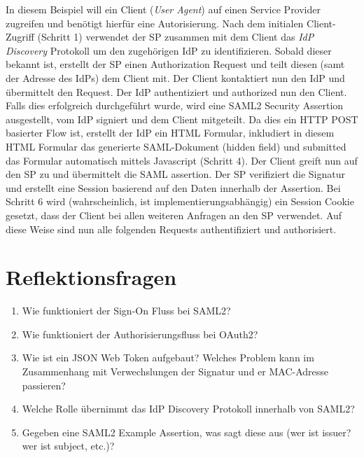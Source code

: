 In diesem Beispiel will ein Client (\textit{User Agent}) auf einen Service Provider zugreifen und benötigt hierfür eine Autorisierung. Nach dem initialen Client-Zugriff (Schritt 1) verwendet der SP zusammen mit dem Client das \textit{IdP Discovery} Protokoll um den zugehörigen IdP zu identifizieren. Sobald dieser bekannt ist, erstellt der SP einen Authorization Request und teilt diesen (samt der Adresse des IdPs) dem Client mit. Der Client kontaktiert nun den IdP und übermittelt den Request.
Der IdP authentiziert und authorized nun den Client. Falls dies erfolgreich durchgeführt wurde, wird eine SAML2 Security Assertion ausgestellt, vom IdP signiert und dem Client mitgeteilt. Da dies ein HTTP POST basierter Flow ist, erstellt der IdP ein HTML Formular, inkludiert in diesem HTML Formular das generierte SAML-Dokument (hidden field) und submitted das Formular automatisch mittels Javascript (Schritt 4). Der Client greift nun auf den SP zu und übermittelt die SAML assertion. Der SP verifiziert die Signatur und erstellt eine Session basierend auf den Daten innerhalb der Assertion. Bei Schritt 6 wird (wahrscheinlich, ist implementierungsabhängig) ein Session Cookie gesetzt, dass der Client bei allen weiteren Anfragen an den SP verwendet. Auf diese Weise sind nun alle folgenden Requests authentifiziert und authorisiert.

\section{Reflektionsfragen}

\begin{enumerate}
	\item Wie funktioniert der Sign-On Fluss bei SAML2?
	\item Wie funktioniert der Authorisierungsfluss bei OAuth2?
	\item Wie ist ein JSON Web Token aufgebaut? Welches Problem kann im Zusammenhang mit Verwechslungen der Signatur und er MAC-Adresse passieren?
	\item Welche Rolle übernimmt das IdP Discovery Protokoll innerhalb von SAML2?
	\item Gegeben eine SAML2 Example Assertion, was sagt diese aus (wer ist issuer? wer ist subject, etc.)?
\end{enumerate}
